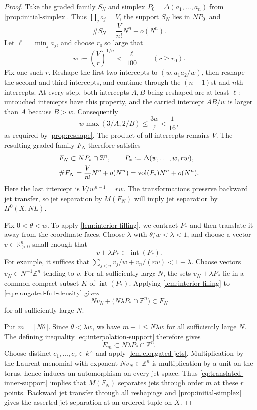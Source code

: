 \begin{proof}
Take the graded family $S_N$ and simplex $P_0=\Delta(a_1,\ldots,a_n)$ from \cref{prop:initial-simplex}. Thus $\prod_j a_j=V$, the support $S_N$ lies in $NP_0$, and
\[
 \#S_N=\frac{V}{n!}N^n+o(N^n).
\]
Let $\ell=\min_j a_j$, and choose $r_0$ so large that
\[
 w:=\left(\frac Vr\right)^{1/n}<\frac{\ell}{100}
 \qquad(r\ge r_0).
\]
Fix one such $r$.  Reshape the first two intercepts to $(w,a_1a_2/w)$, then reshape the second and third intercepts, and continue through the $(n-1)$st and $n$th intercepts.  At every step, both intercepts $A,B$ being reshaped are at least $\ell$: untouched intercepts have this property, and the carried intercept $AB/w$ is larger than $A$ because $B>w$. Consequently
\[
 w\max(3/A,2/B)\le\frac{3w}{\ell}<\frac1{16},
\]
as required by \cref{prop:reshape}.  The product of all intercepts remains $V$.  The resulting graded family $F_N$ therefore satisfies
\begin{equation}\label{eq:elongated-full-density}
 \begin{aligned}
 &F_N\subset NP_*\cap\mathbb{Z}^n,
 \qquad P_*:=\Delta(w,\ldots,w,rw),\\
 &\#F_N=\frac{V}{n!}N^n+o(N^n)
        =\operatorname{vol}(P_*)N^n+o(N^n).
 \end{aligned}
\end{equation}
Here the last intercept is $V/w^{n-1}=rw$. The transformations preserve backward jet transfer, so jet separation by $M(F_N)$ will imply jet separation by $H^0(X,NL)$.

Fix $0<\theta<w$.  To apply \cref{lem:interior-filling}, we contract $P_*$ and then translate it away from the coordinate faces. Choose $\lambda$ with $\theta/w<\lambda<1$, and choose a vector $v\in\mathbb{R}_{>0}^n$ small enough that
\[
 v+\lambda P_*\subset\operatorname{int}(P_*).
\]
For example, it suffices that $\sum_{j<n}v_j/w+v_n/(rw)<1-\lambda$. Choose vectors $v_N\in N^{-1}\mathbb{Z}^n$ tending to $v$. For all sufficiently large $N$, the sets $v_N+\lambda P_*$ lie in a common compact subset $K$ of $\operatorname{int}(P_*)$.  Applying \cref{lem:interior-filling} to \eqref{eq:elongated-full-density} gives
\begin{equation}\label{eq:translated-inner-support}
 Nv_N+\bigl(N\lambda P_*\cap\mathbb{Z}^n\bigr)\subset F_N
\end{equation}
for all sufficiently large $N$.

Put $m=\lfloor N\theta\rfloor$.  Since $\theta<\lambda w$, we have $m+1\le N\lambda w$ for all sufficiently large $N$. The defining inequality \eqref{eq:interpolation-support} therefore gives
\[
 E_m\subset N\lambda P_*\cap\mathbb{Z}^n.
\]
Choose distinct $c_1,\ldots,c_r\in k^\times$ and apply \cref{lem:elongated-jets}.  Multiplication by the Laurent monomial with exponent $Nv_N\in\mathbb{Z}^n$ is multiplication by a unit on the torus, hence induces an automorphism on every jet space.  Thus \eqref{eq:translated-inner-support} implies that $M(F_N)$ separates jets through order $m$ at these $r$ points.  Backward jet transfer through all reshapings and \cref{prop:initial-simplex} gives the asserted jet separation at an ordered tuple on $X$.


\end{proof}
